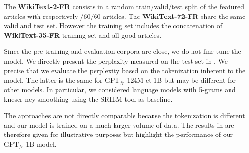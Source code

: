 The \textbf{WikiText-2-FR} consists in a random train/valid/test split of the featured articles with respectively /60/60 articles. The \textbf{WikiText-72-FR} share the same valid and test set. However the training set includes the concatenation of \textbf{WikiText-35-FR} training set and all good articles.

\begin{table}[!ht]
\footnotesize
{}
\caption{Descriptive statistics for the corpora \textbf{WikiText-FR}. We evaluate the vocabulary size using the MOSES tokenizer \parencite{koehn_07}. Tokens out of vocabulary correspond to those that occur less than three times.}
\end{table}


Since the pre-training and evaluation corpora are close, we do not fine-tune the model. We directly present the perplexity measured on the test set in . We precise that we evaluate the perplexity based on the tokenization inherent to the model. The latter is the same for $\text{GPT}_{fr}$-124M et 1B but may be different for other models. In particular, we considered language models with 5-grams and kneser-ney smoothing \parencite{ney_94} using the SRILM tool \parencite{stolcke_02} as baseline.

The approaches are not directly comparable because the tokenization is different and our model is trained on a much larger volume of data. The results in  are therefore given for illustrative purposes but highlight the performance of our $\text{GPT}_{fr}$-1B model. 


